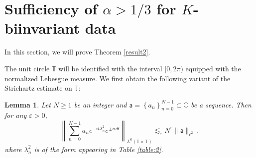 \documentclass[12pt]{amsart}
\newtheorem{lemma}[theorem]{Lemma}
\theoremstyle{definition}
\newcommand{\C}{\mathbb C}%
\newcommand{\T}{\mathbb T}%
\newcommand{\sa}{\textsf{a}}
\numberwithin{equation}{section}
\begin{document}
\section{Sufficiency of $\alpha >1/3$ for $K$-biinvariant data}
In this section, we will prove Theorem \ref{result2}.

The unit circle $\T$ will be identified with the interval $[0,2\pi)$ equipped with the normalized Lebesgue measure. We first obtain the following variant of the Strichartz estimate on $\T$:
\begin{lemma} \label{Strichartz}
Let $N \ge 1$ be an integer and $\sa =\left\{a_n\right\}_{n=0}^{N-1} \subset \C$ be a sequence. Then for any $\varepsilon>0$,
\begin{equation*}
\left\|\sum_{n=0}^{N-1} a_n e^{-it\lambda^2_n}e^{\pm in\theta} \right\|_{L^6(\T \times \T)} \lesssim_\varepsilon N^\varepsilon \|\sa\|_{\ell^2}\:, 
\end{equation*}
where $\lambda^2_n$ is of the form appearing in Table \ref{table:2}.
\end{lemma}
\end{document}
